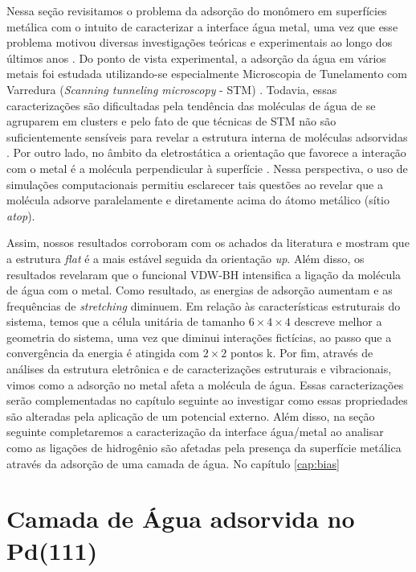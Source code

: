 Nessa seção revisitamos o problema da adsorção do monômero em superfícies metálica com o intuito de caracterizar a interface água metal, uma vez que esse problema motivou diversas investigações teóricas e experimentais ao longo dos últimos anos \cite{salmeron,monomerexp1, monomerexp2,michaedelis,monomer,adrien,review_new}. Do ponto de vista experimental, a adsorção da água em vários metais foi estudada utilizando-se especialmente Microscopia de Tunelamento com Varredura (\textit{Scanning tunneling microscopy} - STM) \cite{salmeron,monomerexp1,monomerexp2}. Todavia, essas caracterizações são dificultadas pela tendência das moléculas de água de se agruparem em clusters e pelo fato de que técnicas de STM não são suficientemente sensíveis para revelar a estrutura interna de moléculas adsorvidas \cite{michaedelis}. Por outro lado, no âmbito da eletrostática a orientação que favorece a interação com o metal é a molécula perpendicular à superfície \cite{adrien}. Nessa perspectiva, o uso de simulações computacionais permitiu esclarecer tais questões ao revelar que a molécula adsorve paralelamente e diretamente acima do átomo metálico (sítio \textit{atop}).

Assim, nossos resultados corroboram com os achados da literatura e mostram que a estrutura \textit{flat} é a mais estável seguida da orientação \textit{up}. Além disso, os resultados revelaram que o funcional VDW-BH intensifica a ligação da molécula de água com o metal. Como resultado, as energias de adsorção aumentam e as frequências de \textit{stretching} diminuem. Em relação às características estruturais do sistema, temos que a célula unitária de tamanho $ 6\times4\times4 $ descreve melhor a geometria do sistema, uma vez que diminui interações fictícias, ao passo que a convergência da energia é atingida com $ 2\times2 $ pontos k. Por fim, através de análises da estrutura eletrônica e de caracterizações estruturais e vibracionais, vimos como a adsorção no metal afeta a molécula de água. Essas caracterizações serão complementadas no capítulo seguinte ao investigar como essas propriedades são alteradas pela aplicação de um potencial externo. Além disso, na seção seguinte completaremos a caracterização da interface água/metal ao analisar como as ligações de hidrogênio são afetadas pela presença da superfície metálica através da adsorção de uma camada de água. No capítulo \ref{cap:bias}

\section{Camada de Água adsorvida no Pd(111)\label{sec:re-la}}
